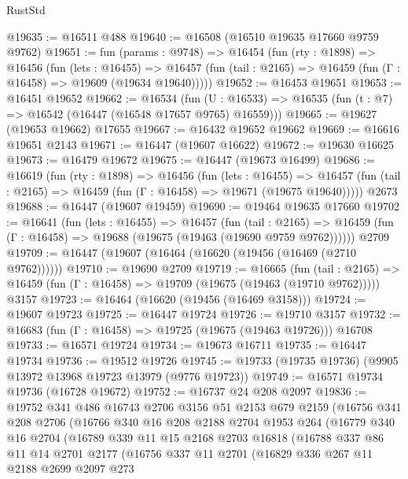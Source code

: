 \begin{lexlean}{RustStd}
\begin{coremodule}
@19635 := @16511 @488
@19640 := @16508 (@16510 @19635 @17660 @9759 @9762)
@19651 := fun (params : @9748) =>
  @16454
    (fun (rty : @1898) =>
    @16456
      (fun (lets : @16455) =>
      @16457 (fun (tail : @2165) => @16459 (fun (Γ : @16458) => @19609 (@19634 @19640)))))
@19652 := @16453 @19651
@19653 := @16451 @19652
@19662 := @16534
    (fun (U : @16533) => @16535 (fun (t : @7) => @16542 (@16447 (@16548 @17657 @9765) @16559)))
@19665 := @19627 (@19653 @19662) @17655
@19667 := @16432 @19652 @19662
@19669 := @16616 @19651 @2143
@19671 := @16447 (@19607 @16622)
@19672 := @19630 @16625
@19673 := @16479 @19672
@19675 := @16447 (@19673 @16499)
@19686 := @16619
    (fun (rty : @1898) =>
    @16456
      (fun (lets : @16455) =>
      @16457 (fun (tail : @2165) => @16459 (fun (Γ : @16458) => @19671 (@19675 @19640)))))
    @2673
@19688 := @16447 (@19607 @19459)
@19690 := @19464 @19635 @17660
@19702 := @16641
    (fun (lets : @16455) =>
    @16457
      (fun (tail : @2165) =>
      @16459 (fun (Γ : @16458) => @19688 (@19675 (@19463 (@19690 @9759 @9762))))))
    @2709
@19709 := @16447 (@19607 (@16464 (@16620 (@19456 (@16469 (@2710 @9762))))))
@19710 := @19690 @2709
@19719 := @16665
    (fun (tail : @2165) => @16459 (fun (Γ : @16458) => @19709 (@19675 (@19463 (@19710 @9762)))))
    @3157
@19723 := @16464 (@16620 (@19456 (@16469 @3158)))
@19724 := @19607 @19723
@19725 := @16447 @19724
@19726 := @19710 @3157
@19732 := @16683 (fun (Γ : @16458) => @19725 (@19675 (@19463 @19726))) @16708
@19733 := @16571 @19724
@19734 := @19673 @16711
@19735 := @16447 @19734
@19736 := @19512 @19726
@19745 := @19733 (@19735 @19736) (@9905 @13972 @13968 @19723 @13979 (@9776 @19723))
@19749 := @16571 @19734 @19736 (@16728 @19672)
@19752 := @16737 @24 @208 @2097
@19836 := @19752
    @341
    @486
    @16743
    @2706
    @3156
    @51
    @2153
    @679
    @2159
    (@16756
      @341
      @208
      @2706
      (@16766
        @340
        @16
        @208
        @2188
        @2704
        @1953
        @264
        (@16779
          @340
          @16
          @2704
          (@16789
            @339
            @11
            @15
            @2168
            @2703
            @16818
            (@16788
              @337
              @86
              @11
              @14
              @2701
              @2177
              (@16756
                @337
                @11
                @2701
                (@16829
                  @336
                  @267
                  @11
                  @2188
                  @2699
                  @2097
                  @273

\end{coremodule}
\end{lexlean}
